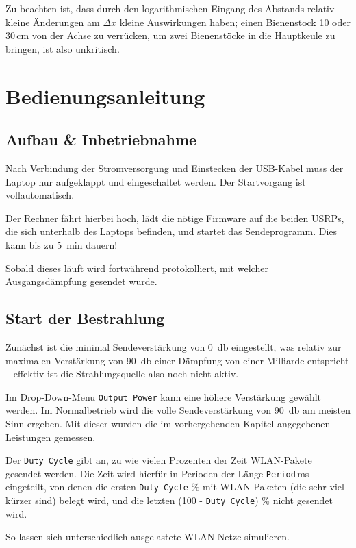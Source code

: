 \documentclass[a4paper,twoside]{scrreprt}
\begin{document}
Zu beachten ist, dass durch den logarithmischen Eingang des Abstands relativ
kleine Änderungen am $\Delta x$ kleine Auswirkungen haben; einen Bienenstock 10
oder 30\,\si{\centi\meter} von der Achse zu verrücken, um zwei Bienenstöcke in
die Hauptkeule zu bringen, ist also unkritisch.

\chapter{Bedienungsanleitung}
\section{Aufbau \& Inbetriebnahme}

Nach Verbindung der Stromversorgung und Einstecken der USB-Kabel muss der Laptop
nur aufgeklappt und eingeschaltet werden. Der Startvorgang ist vollautomatisch.

Der Rechner fährt hierbei hoch, lädt die nötige Firmware auf die beiden USRPs,
die sich unterhalb des Laptops befinden, und startet das Sendeprogramm. Dies
kann bis zu \SI{5}{\minute} dauern!

Sobald dieses läuft wird fortwährend protokolliert, mit welcher Ausgangsdämpfung
gesendet wurde.
\section{Start der Bestrahlung}

Zunächst ist die minimal Sendeverstärkung von \SI{0}{\decibel} eingestellt, was
relativ zur maximalen Verstärkung von \SI{90}{\decibel} einer Dämpfung von einer
Milliarde entspricht -- effektiv ist die Strahlungsquelle also noch nicht aktiv.

Im Drop-Down-Menu \texttt{Output Power} kann eine höhere Verstärkung gewählt
werden. Im Normalbetrieb wird die volle Sendeverstärkung von \SI{90}{\decibel}
am meisten Sinn ergeben. Mit dieser wurden die im vorhergehenden Kapitel
angegebenen Leistungen gemessen.

Der \texttt{Duty Cycle} gibt an, zu wie vielen Prozenten der Zeit WLAN-Pakete
gesendet werden. Die Zeit wird hierfür in Perioden der Länge
\texttt{Period}\,\si{\milli\second} eingeteilt, von denen die ersten
\texttt{Duty Cycle} \% mit WLAN-Paketen (die sehr viel kürzer sind) belegt wird,
und die letzten (100 - \texttt{Duty Cycle}) \% nicht gesendet wird.

So lassen sich unterschiedlich ausgelastete WLAN-Netze simulieren.
\end{document}
